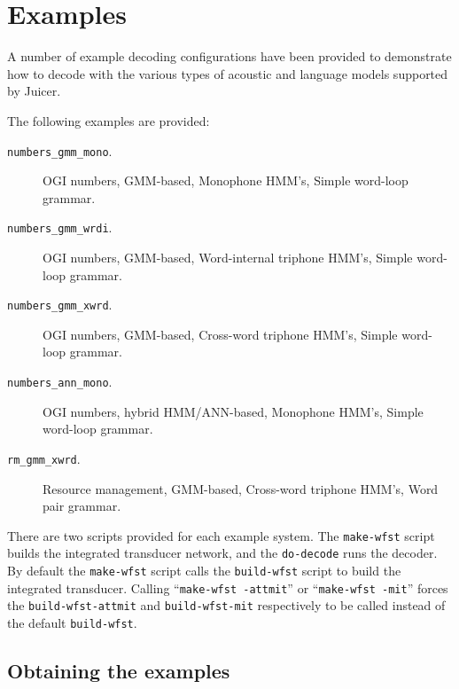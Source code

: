\documentclass[a4paper,12pt]{report}
\begin{document}
\chapter{Examples}
\label{chap:examples}

A number of example decoding configurations have been provided to demonstrate how to decode with the various types of acoustic and language models supported by Juicer.

The following examples are provided:

\begin{description}
\item [{\tt numbers\_gmm\_mono}.] OGI numbers, GMM-based, Monophone HMM's, Simple word-loop grammar.
\item [{\tt numbers\_gmm\_wrdi}.] OGI numbers, GMM-based, Word-internal triphone HMM's, Simple word-loop grammar.
\item [{\tt numbers\_gmm\_xwrd}.] OGI numbers, GMM-based, Cross-word triphone HMM's, Simple word-loop grammar.
\item [{\tt numbers\_ann\_mono}.] OGI numbers, hybrid HMM/ANN-based, Monophone HMM's, Simple word-loop grammar.
\item [{\tt rm\_gmm\_xwrd}.] Resource management, GMM-based, Cross-word triphone HMM's, Word pair grammar.
\end{description}

There are two scripts provided for each example system. The {\tt make-wfst} script builds the integrated transducer network, and the {\tt do-decode} runs the decoder. By default the {\tt make-wfst} script calls the {\tt build-wfst} script to build the integrated transducer. Calling ``{\tt make-wfst -attmit}'' or ``{\tt make-wfst -mit}'' forces the {\tt build-wfst-attmit} and {\tt build-wfst-mit} respectively to be called instead of the default {\tt build-wfst}.


\section{Obtaining the examples}
\end{document}

